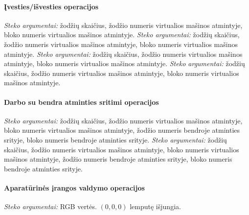 \documentclass{scrartcl}
\begin{document}
                \paragraph{Įvesties/išvesties operacijos}
                    \emph{Steko argumentai:} žodžių skaičius, žodžio numeris virtualios mašinos atmintyje, bloko numeris virtualios mašinos atmintyje.
                    \emph{Steko argumentai:} žodžių skaičius, žodžio numeris virtualios mašinos atmintyje, bloko numeris virtualios mašinos atmintyje.
                    \emph{Steko argumentai:} žodžių skaičius, žodžio numeris virtualios mašinos atmintyje, bloko numeris virtualios mašinos atmintyje.
                    \emph{Steko argumentai:} žodžių skaičius, žodžio numeris virtualios mašinos atmintyje, bloko numeris virtualios mašinos atmintyje.
                \paragraph{Darbo su bendra atminties sritimi operacijos}
                    \emph{Steko argumentai:} žodžių skaičius, žodžio numeris virtualios mašinos atmintyje, bloko numeris virtualios mašinos atmintyje, žodžio numeris bendroje atminties srityje, bloko numeris bendroje atminties srityje.
                    \emph{Steko argumentai:} žodžių skaičius, žodžio numeris virtualios mašinos atmintyje, bloko numeris virtualios mašinos atmintyje, žodžio numeris bendroje atminties srityje, bloko numeris bendroje atminties srityje.
                \paragraph{Aparatūrinės įrangos valdymo operacijos}
                    \emph{Steko argumentai:} RGB vertės. $(0, 0, 0)$ lemputę išjungia.
\end{document}
